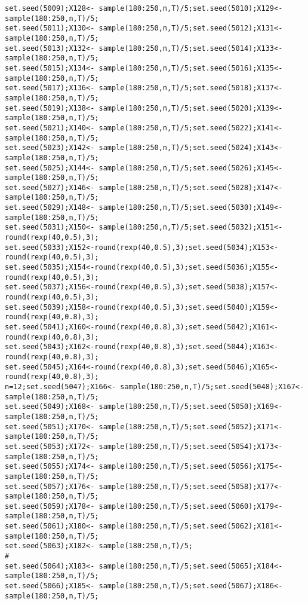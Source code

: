 \documentclass[]{article}
\begin{document}
\begin{verbatim}
set.seed(5009);X128<- sample(180:250,n,T)/5;set.seed(5010);X129<- sample(180:250,n,T)/5;
set.seed(5011);X130<- sample(180:250,n,T)/5;set.seed(5012);X131<- sample(180:250,n,T)/5;
set.seed(5013);X132<- sample(180:250,n,T)/5;set.seed(5014);X133<- sample(180:250,n,T)/5;
set.seed(5015);X134<- sample(180:250,n,T)/5;set.seed(5016);X135<- sample(180:250,n,T)/5;
set.seed(5017);X136<- sample(180:250,n,T)/5;set.seed(5018);X137<- sample(180:250,n,T)/5;
set.seed(5019);X138<- sample(180:250,n,T)/5;set.seed(5020);X139<- sample(180:250,n,T)/5;
set.seed(5021);X140<- sample(180:250,n,T)/5;set.seed(5022);X141<- sample(180:250,n,T)/5;
set.seed(5023);X142<- sample(180:250,n,T)/5;set.seed(5024);X143<- sample(180:250,n,T)/5;
set.seed(5025);X144<- sample(180:250,n,T)/5;set.seed(5026);X145<- sample(180:250,n,T)/5;
set.seed(5027);X146<- sample(180:250,n,T)/5;set.seed(5028);X147<- sample(180:250,n,T)/5;
set.seed(5029);X148<- sample(180:250,n,T)/5;set.seed(5030);X149<- sample(180:250,n,T)/5;
set.seed(5031);X150<- sample(180:250,n,T)/5;set.seed(5032);X151<-round(rexp(40,0.5),3);
set.seed(5033);X152<-round(rexp(40,0.5),3);set.seed(5034);X153<-round(rexp(40,0.5),3);
set.seed(5035);X154<-round(rexp(40,0.5),3);set.seed(5036);X155<-round(rexp(40,0.5),3);
set.seed(5037);X156<-round(rexp(40,0.5),3);set.seed(5038);X157<-round(rexp(40,0.5),3);
set.seed(5039);X158<-round(rexp(40,0.5),3);set.seed(5040);X159<-round(rexp(40,0.8),3);
set.seed(5041);X160<-round(rexp(40,0.8),3);set.seed(5042);X161<-round(rexp(40,0.8),3);
set.seed(5043);X162<-round(rexp(40,0.8),3);set.seed(5044);X163<-round(rexp(40,0.8),3);
set.seed(5045);X164<-round(rexp(40,0.8),3);set.seed(5046);X165<-round(rexp(40,0.8),3);
n=12;set.seed(5047);X166<- sample(180:250,n,T)/5;set.seed(5048);X167<- sample(180:250,n,T)/5;
set.seed(5049);X168<- sample(180:250,n,T)/5;set.seed(5050);X169<- sample(180:250,n,T)/5;
set.seed(5051);X170<- sample(180:250,n,T)/5;set.seed(5052);X171<- sample(180:250,n,T)/5;
set.seed(5053);X172<- sample(180:250,n,T)/5;set.seed(5054);X173<- sample(180:250,n,T)/5;
set.seed(5055);X174<- sample(180:250,n,T)/5;set.seed(5056);X175<- sample(180:250,n,T)/5;
set.seed(5057);X176<- sample(180:250,n,T)/5;set.seed(5058);X177<- sample(180:250,n,T)/5;
set.seed(5059);X178<- sample(180:250,n,T)/5;set.seed(5060);X179<- sample(180:250,n,T)/5;
set.seed(5061);X180<- sample(180:250,n,T)/5;set.seed(5062);X181<- sample(180:250,n,T)/5;
set.seed(5063);X182<- sample(180:250,n,T)/5;
#
set.seed(5064);X183<- sample(180:250,n,T)/5;set.seed(5065);X184<- sample(180:250,n,T)/5;
set.seed(5066);X185<- sample(180:250,n,T)/5;set.seed(5067);X186<- sample(180:250,n,T)/5;

\end{verbatim}
\end{document}
